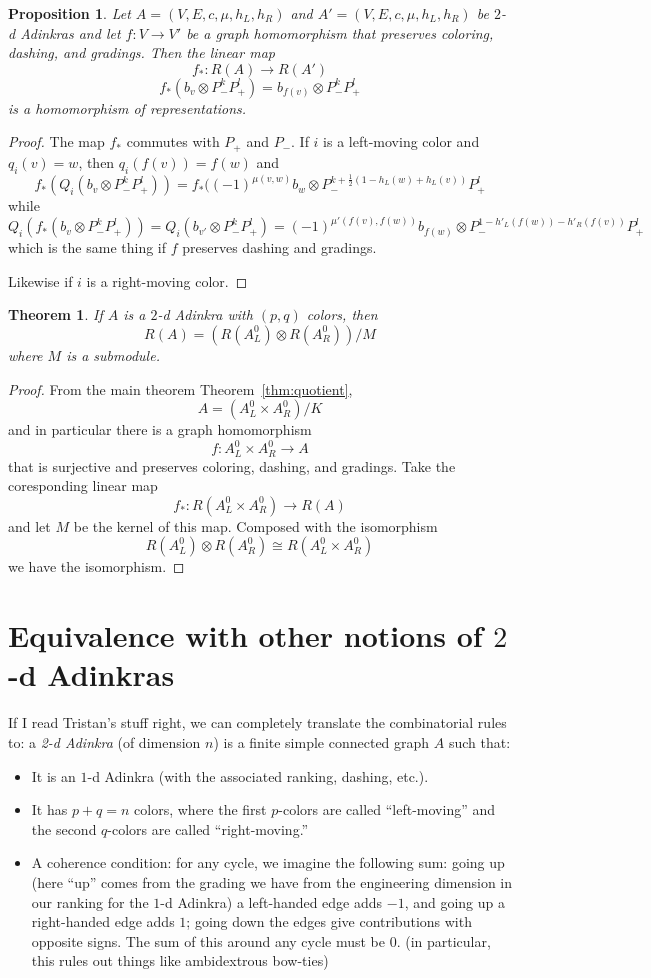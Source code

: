 \documentclass[12pt,twoside,singlespace]{article}
\numberwithin{equation}{section}
\newtheorem{thm}[equation]{Theorem}
\newtheorem{prop}[equation]{Proposition}
\theoremstyle{definition}
\begin{document}
\begin{prop}
Let $A=(V,E,c,\mu,h_L,h_R)$ and $A'=(V,E,c,\mu,h_L,h_R)$ be $2$-d Adinkras and let $f:V\to V'$ be a graph homomorphism that preserves coloring, dashing, and gradings.  Then the linear map
\[f_*:R(A)\to R(A')\]
\[f_*(b_v\otimes P_-^kP_+^l)=b_{f(v)}\otimes P_-^kP_+^l\]
is a homomorphism of representations.
\end{prop}
\begin{proof}
The map $f_*$ commutes with $P_+$ and $P_-$.  If $i$ is a left-moving color and $q_i(v)=w$, then $q_i(f(v))=f(w)$ and
\[f_*(Q_i(b_v\otimes P_-^kP_+^l))=f_*((-1)^{\mu(v,w)}b_w\otimes P_-^{k+\frac12(1-h_L(w)+h_L(v))}P_+^l\]
while
\[Q_i(f_*(b_v\otimes P_-^kP_+^l))=Q_i(b_{v'}\otimes P_-^kP_+^l)
=(-1)^{\mu'(f(v),f(w))}b_{f(w)}\otimes P_-^{1-h'_L(f(w))-h'_R(f(v))}P_+^l\]
which is the same thing if $f$ preserves dashing and gradings.

Likewise if $i$ is a right-moving color.
\end{proof}

\begin{thm}
If $A$ is a $2$-d Adinkra with $(p,q)$ colors, then 
\[R(A)=(R(A_L^0)\otimes R(A_R^0))/M\]
where $M$ is a submodule.
\end{thm}
\begin{proof}
From the main theorem Theorem~\ref{thm:quotient},
\[A=(A_L^0\times A_R^0)/K\]
and in particular there is a graph homomorphism
\[f:A_L^0\times A_R^0\to A\]
that is surjective and preserves coloring, dashing, and gradings.  Take the coresponding linear map
\[f_*:R(A_L^0\times A_R^0)\to R(A)\]
and let $M$ be the kernel of this map.  Composed with the isomorphism
\[R(A_L^0)\otimes R(A_R^0)\cong R(A_L^0\times A_R^0)\]
we have the isomorphism.
\end{proof}


\section{Equivalence with other notions of $2$-d Adinkras}


If I read Tristan's stuff right, we can completely translate the combinatorial rules to: a \emph{2-d Adinkra} (of dimension $n$) is a finite simple connected graph $A$ such that:
\begin{itemize}
\item It is an $1$-d Adinkra (with the associated ranking, dashing, etc.).
\item It has $p + q = n$ colors, where the first $p$-colors are called ``left-moving'' and the second $q$-colors are called ``right-moving.''
\item A coherence condition: for any cycle, we imagine the following sum: going up (here ``up'' comes from the grading we have from the engineering dimension in our ranking for the $1$-d Adinkra) a left-handed edge adds $-1$, and going up a right-handed edge adds $1$; going down the edges give contributions with opposite signs. The sum of this around any cycle must be $0$. (in particular, this rules out things like ambidextrous bow-ties)
\end{itemize} 
\end{document}
